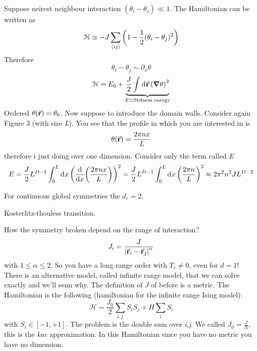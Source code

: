 \documentclass[../main/main.tex]{subfiles}
\begin{document}
Suppose neirest neighbour interaction \( (\theta _i - \theta _j) \ll 1 \). The Hamiltonian can be written as
\begin{equation}
  \mathcal{H} \simeq - J \sum_{\expval{ij} }^{} \qty(1- \frac{1}{2}(\theta _i - \theta _j)^2)
\end{equation}
Therefore
\begin{equation}
  \theta _i - \theta _j \sim \partial_x{\theta }
\end{equation}
\begin{equation}
  \mathcal{H} = E_0 + \underbrace{\frac{J}{2} \int_{}^{} \dd[]{\va{r}} \qty(\grad \theta )^2 }_{E \equiv \text{Stifness energy}}
\end{equation}
Ordered \( \theta (\va{r}) = \theta _0 \). Now suppose to introduce the domain walls. Consider again Figure 3 (with size \emph{L}). You see that the profile in which you are interested in is
\begin{equation}
  \theta (\va{r}) = \frac{2 \pi n x}{L}
\end{equation}
therefore i just doing over one dimension. Consider only the term called \emph{E}
\begin{equation}
  E = \frac{J}{2} L^{D-1} \int_{0}^{L} \dd[]{x} \qty(\dv{}{x} \qty(\frac{2 \pi n x}{L})  )^2 = \frac{J}{2} L^{D-1} \int_{0}^{L} \dd[]{x} \qty(\frac{2 \pi n}{L})^2 \approx 2 \pi ^2 n^2 J L^{D-2}
\end{equation}
\begin{theorem}
  For continuous global symmetries the \( d_c =2 \).
\end{theorem}
Kosterlitz-thouless transition.

How the symmetry broken depend on the range of interaction?
\begin{equation}
  J_i = \frac{J}{\abs{\va{r}_i - \va{r}_j}^\alpha  }
\end{equation}
with \( 1 \le \alpha \le 2 \). So you have a long range order with \( T_c \neq 0 \), even for \( d=1 \)!
There is an alternative model, called infinite range model, that we can solve exactly and we'll senn why. The definition of \emph{J} of before is a metric.
The Hamiltonian is the following (hamiltonian for the infinite range Ising model):
\begin{equation}
  \mathcal{H} = \frac{J_0}{2} \sum_{i,j}^{} S_i S_j + H \sum_{i}^{}  S_i
\end{equation}
with \( S_i \in [-1,+1] \). The problem is the double sum over \emph{i,j}. We called \( J_0 = \frac{J}{N} \), this is the \emph{kac} approximation.
In this Hamiltonian since you have no metric you have no dimension.
\end{document}
